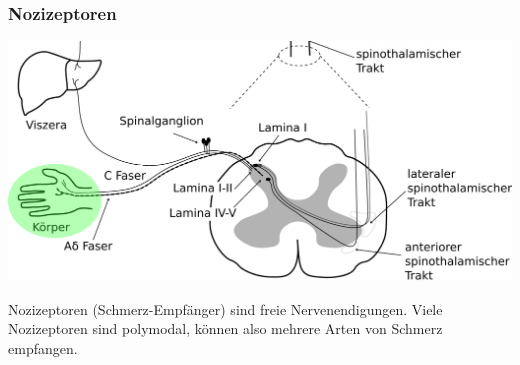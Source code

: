 \documentclass{beamer}
\begin{document}
\begin{frame}
\frametitle{Nozizeptoren}


\begin{center}
\includegraphics[width=\textwidth]{Schmerz_aufsteigend_bis_Rueckenmark_Nozizeptor.png}
\end{center}

Nozizeptoren (Schmerz-Empfänger) sind freie Nervenendigungen. Viele Nozizeptoren sind \textcolor{theme}{polymodal}, können also mehrere Arten von Schmerz empfangen. 

 
\end{frame}
\end{document}
